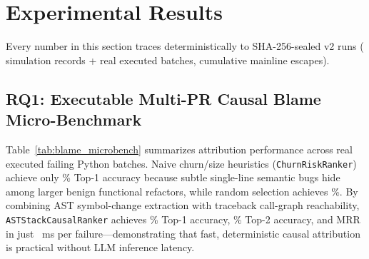 \section{Experimental Results}
\label{sec:results}

Every number in this section traces deterministically to \TotalSealedRuns{} SHA-256-sealed v2 runs (\TotalSealedRecords{} simulation records + \BenchTotalBatches{} real executed batches, \TotalEscapedDefects{} cumulative mainline escapes).

\subsection{RQ1: Executable Multi-PR Causal Blame Micro-Benchmark}
Table~\ref{tab:blame_microbench} summarizes attribution performance across \BenchTotalBatches{} real executed failing Python batches. Naive churn/size heuristics (\texttt{ChurnRiskRanker}) achieve only \BenchChurnTopOnePct{}\% Top-1 accuracy because subtle single-line semantic bugs hide among larger benign functional refactors, while random selection achieves \BenchRandTopOnePct{}\%. By combining AST symbol-change extraction with traceback call-graph reachability, \texttt{ASTStackCausalRanker} achieves \BenchASTTopOnePct{}\% Top-1 accuracy, \BenchASTTopTwoPct{}\% Top-2 accuracy, and \BenchASTMRR{} MRR in just \BenchASTMs{}~ms per failure---demonstrating that fast, deterministic causal attribution is practical without LLM inference latency.





